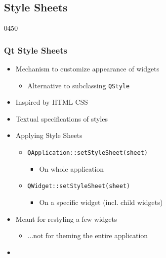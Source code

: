 %
%
%
%

\subsection{Style Sheets}\label{style_sheets}

\begin{slide}{0450}\frametitle{Qt Style Sheets}
\begin{itemize}
\item Mechanism to customize appearance of widgets
  \begin{itemize}
  \item Alternative to subclassing \texttt{QStyle}
  \end{itemize}
\item Inspired by HTML CSS
\item Textual specifications of styles
\item Applying Style Sheets
  \begin{itemize}
  \item \texttt{QApplication::setStyleSheet(sheet)}
    \begin{itemize}
    \item On whole application
    \end{itemize}
  \item \texttt{QWidget::setStyleSheet(sheet)}
    \begin{itemize}
    \item On a specific widget (incl. child widgets)
    \end{itemize}
 \end{itemize}
\item Meant for restyling a few widgets
  \begin{itemize}
  \item ...not for theming the entire application
  \end{itemize}
\item[] 
\end{itemize}
\end{slide}


